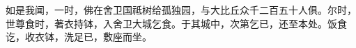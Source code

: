 \let\oldcolumnsep=\columnsep
\let\oldcolumnseprule=\columnseprule
\setlength{\columnsep}{12pt}
\setlength{\columnseprule}{1pt}
\setlength{\columnsep}{\oldcolumnsep}
\setlength{\columnseprule}{\oldcolumnseprule}

\begin{multicols}{2}
如是我闻，一时，佛在舍卫国祗树给孤独园，与大比丘众千二百五十人俱。尔时，世尊食时，著衣持钵，入舍卫大城乞食。于其城中，次第乞已，还至本处。饭食讫，收衣钵，洗足已，敷座而坐。
\end{multicols}
